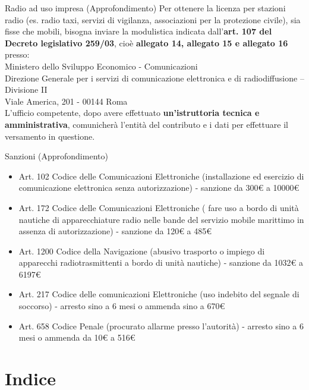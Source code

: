 \documentclass[aspectratio=169]{beamer}
\begin{document}
\begin{frame}{Radio ad uso impresa (Approfondimento)}
	Per ottenere la licenza per stazioni radio (es. radio taxi, servizi di vigilanza, associazioni per la protezione civile), sia fisse che mobili, bisogna inviare la modulistica indicata dall'\textbf{art. 107 del Decreto legislativo 259/03}, cioè \textbf{allegato 14, allegato 15 e allegato 16} presso:\\
	\medskip
	Ministero dello Sviluppo Economico - Comunicazioni\\
	Direzione Generale per i servizi di comunicazione elettronica e di radiodiffusione – Divisione II\\
	Viale America, 201 - 00144 Roma\\
	\medskip
	L'ufficio competente, dopo avere effettuato \textbf{un'istruttoria tecnica e amministrativa}, comunicherà l'entità del contributo e i dati per effettuare il versamento in questione.
\end{frame}

\begin{frame}{Sanzioni (Approfondimento)}
	\begin{itemize}
		\item Art. 102 Codice delle Comunicazioni Elettroniche (installazione ed esercizio di comunicazione elettronica senza autorizzazione) - sanzione da 300€ a 10000€
		\item Art. 172 Codice delle Comunicazioni Elettroniche ( fare uso a bordo di unità nautiche di apparecchiature radio nelle bande del servizio mobile marittimo in assenza di autorizzazione) - sanzione da 120€ a 485€
		\item Art. 1200 Codice della Navigazione (abusivo trasporto o impiego di apparecchi radiotrasmittenti a bordo di unità nautiche) - sanzione da 1032€ a 6197€
		\item Art. 217 Codice delle comunicazioni Elettroniche (uso indebito del segnale di soccorso) - arresto sino a 6 mesi o ammenda sino a 670€
		\item Art. 658 Codice Penale (procurato allarme presso l’autorità) - arresto sino a 6 mesi o ammenda da 10€ a 516€
	\end{itemize}
\end{frame}

\section{Indice}
\begin{frame}[label = index]
	\tableofcontents
\end{frame}
\end{document}
